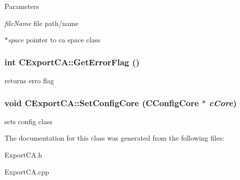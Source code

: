 \begin{DoxyParams}{Parameters}
\item[{\em fileName}]file path/name \item[{\em $\ast$space}]pointer to ca space class \end{DoxyParams}
\hypertarget{classCExportCA_a88c08f02b37ad712b7d924544ec6b15f}{
\subsubsection[{GetErrorFlag}]{\setlength{\rightskip}{0pt plus 5cm}int CExportCA::GetErrorFlag ()}}
\label{classCExportCA_a88c08f02b37ad712b7d924544ec6b15f}
returns erro flag \hypertarget{classCExportCA_a36ef474f274f8cb123073968d6e33a9d}{
\subsubsection[{SetConfigCore}]{\setlength{\rightskip}{0pt plus 5cm}void CExportCA::SetConfigCore ({\bf CConfigCore} $\ast$ {\em cCore})}}
\label{classCExportCA_a36ef474f274f8cb123073968d6e33a9d}
sets config class 

The documentation for this class was generated from the following files:\begin{DoxyCompactItemize}
\item 
ExportCA.h\item 
ExportCA.cpp\end{DoxyCompactItemize}
